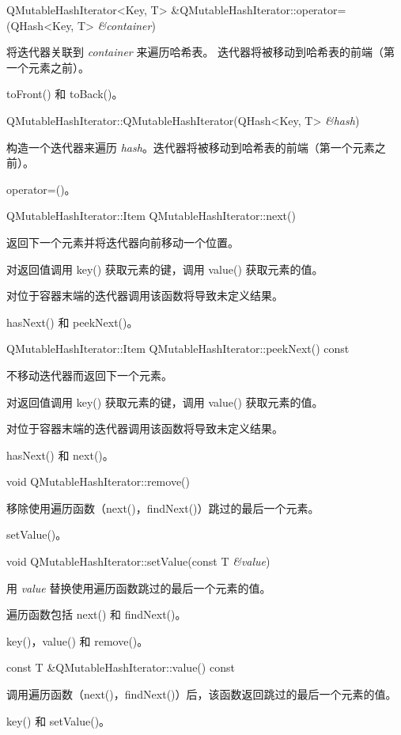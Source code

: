 QMutableHashIterator<Key, T> \&QMutableHashIterator::operator=(QHash<Key, T> \emph{\&container})

将迭代器关联到 \emph{container} 来遍历哈希表。
迭代器将被移动到哈希表的前端（第一个元素之前）。

\begin{seeAlso}
toFront() 和 toBack()。
\end{seeAlso}

QMutableHashIterator::QMutableHashIterator(QHash<Key, T> \emph{\&hash})

构造一个迭代器来遍历 \emph{hash}。迭代器将被移动到哈希表的前端（第一个元素之前）。

\begin{seeAlso}
operator=()。
\end{seeAlso}

QMutableHashIterator::Item QMutableHashIterator::next()

返回下一个元素并将迭代器向前移动一个位置。

对返回值调用 key() 获取元素的键，调用 value() 获取元素的值。

对位于容器末端的迭代器调用该函数将导致未定义结果。

\begin{seeAlso}
hasNext() 和 peekNext()。
\end{seeAlso}

QMutableHashIterator::Item QMutableHashIterator::peekNext() const

不移动迭代器而返回下一个元素。

对返回值调用 key() 获取元素的键，调用 value() 获取元素的值。

对位于容器末端的迭代器调用该函数将导致未定义结果。

\begin{seeAlso}
hasNext() 和 next()。
\end{seeAlso}

void QMutableHashIterator::remove()

移除使用遍历函数（next()，findNext()）跳过的最后一个元素。

\begin{seeAlso}
setValue()。
\end{seeAlso}

void QMutableHashIterator::setValue(const T \emph{\&value})


用 \emph{value} 替换使用遍历函数跳过的最后一个元素的值。

遍历函数包括 next() 和 findNext()。

\begin{seeAlso}
key()，value() 和 remove()。
\end{seeAlso}

const T \&QMutableHashIterator::value() const

调用遍历函数（next()，findNext()）后，该函数返回跳过的最后一个元素的值。

\begin{seeAlso}
key() 和 setValue()。
\end{seeAlso}